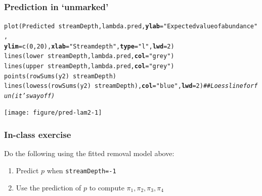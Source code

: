 \documentclass[color=usenames,dvipsnames]{beamer}\usepackage[]{graphicx}\usepackage[]{xcolor}
\makeatletter
\newcommand{\hlnum}[1]{\textcolor[rgb]{0.69,0.494,0}{#1}}%
\newcommand{\hlstr}[1]{\textcolor[rgb]{0.749,0.012,0.012}{#1}}%
\newcommand{\hlcom}[1]{\textcolor[rgb]{0.514,0.506,0.514}{\textit{#1}}}%
\newcommand{\hlopt}[1]{\textcolor[rgb]{0,0,0}{#1}}%
\newcommand{\hlstd}[1]{\textcolor[rgb]{0,0,0}{#1}}%
\newcommand{\hlkwc}[1]{\textcolor[rgb]{0,0,0}{\textbf{#1}}}%
\newcommand{\hlkwd}[1]{\textcolor[rgb]{0.004,0.004,0.506}{#1}}%
\newenvironment{kframe}{%
 \def\at@end@of@kframe{}%
 \ifinner\ifhmode%
  \def\at@end@of@kframe{\end{minipage}}%
  \begin{minipage}{\columnwidth}%
 \fi\fi%
 \def\FrameCommand##1{\hskip\@totalleftmargin \hskip-\fboxsep
 \colorbox{shadecolor}{##1}\hskip-\fboxsep
     \hskip-\linewidth \hskip-\@totalleftmargin \hskip\columnwidth}%
 \MakeFramed {\advance\hsize-\width
   \@totalleftmargin\z@ \linewidth\hsize
   \@setminipage}}%
 {\par\unskip\endMakeFramed%
 \at@end@of@kframe}
\newenvironment{knitrout}{}{} %
\makeatother
\begin{document}
\begin{frame}[fragile]
  \frametitle{Prediction in `unmarked'}
\begin{knitrout}\tiny
{}\color{fgcolor}\begin{kframe}
\begin{alltt}
\hlkwd{plot}\hlstd{(Predicted} \hlopt{~} \hlstd{streamDepth, lambda.pred,} \hlkwc{ylab}\hlstd{=}\hlstr{"Expected value of abundance"}\hlstd{,}
     \hlkwc{ylim}\hlstd{=}\hlkwd{c}\hlstd{(}\hlnum{0}\hlstd{,}\hlnum{20}\hlstd{),} \hlkwc{xlab}\hlstd{=}\hlstr{"Stream depth"}\hlstd{,} \hlkwc{type}\hlstd{=}\hlstr{"l"}\hlstd{,} \hlkwc{lwd}\hlstd{=}\hlnum{2}\hlstd{)}
\hlkwd{lines}\hlstd{(lower} \hlopt{~} \hlstd{streamDepth, lambda.pred,} \hlkwc{col}\hlstd{=}\hlstr{"grey"}\hlstd{)}
\hlkwd{lines}\hlstd{(upper} \hlopt{~} \hlstd{streamDepth, lambda.pred,} \hlkwc{col}\hlstd{=}\hlstr{"grey"}\hlstd{)}
\hlkwd{points}\hlstd{(}\hlkwd{rowSums}\hlstd{(y2)}\hlopt{~}\hlstd{streamDepth)}
\hlkwd{lines}\hlstd{(}\hlkwd{lowess}\hlstd{(}\hlkwd{rowSums}\hlstd{(y2)}\hlopt{~}\hlstd{streamDepth),} \hlkwc{col}\hlstd{=}\hlstr{"blue"}\hlstd{,} \hlkwc{lwd}\hlstd{=}\hlnum{2}\hlstd{)}  \hlcom{## Loess line for fun (it's way off)}
\end{alltt}
\end{kframe}

{\centering \texttt{[image: figure/pred-lam2-1]} 

}


\end{knitrout}
\end{frame}







\begin{frame}[fragile]
  \frametitle{In-class exercise}
  Do the following using the fitted removal model above:
  \begin{enumerate}
    \normalsize
    \item Predict $p$ when \verb+streamDepth=-1+
    \item Use the prediction of $p$ to compute $\pi_1, \pi_2, \pi_3, \pi_4$
  \end{enumerate}
\end{frame}
\end{document}
